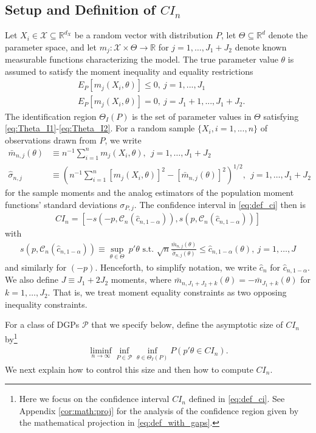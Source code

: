 \documentclass[letterpaper,11pt]{article}
\theoremstyle{myplain}
\theoremstyle{mydefinition}
\theoremstyle{myremark}
\newcommand{\R}{\mathbb{R}}
\newcommand{\cX}{\mathcal{X}}
\numberwithin{equation}{section}
\numberwithin{figure}{section}
\begin{document}
\subsection{Setup and Definition of $CI_n$}
Let $X_i\in\mathcal X\subseteq\mathbb R^{d_X}$ be a random vector with distribution $P$, let $\Theta\subseteq\mathbb R^{d}$ denote the parameter space, and let $m_j:\cX\times\Theta\to\R$ for $j=1,\dots,J_1+J_2$ denote known measurable functions characterizing the model. The true parameter value $\theta$ is assumed to satisfy the moment inequality and equality restrictions
\begin{align}
&E_{P}[m_j(X_i,\theta)]\le 0,~ j=1,..., J_1 \label{eq:Theta_I1}\\
&E_{P}[m_j(X_i,\theta)]= 0,~j=J_1+1,..., J_1+J_2.\label{eq:Theta_I2}
\end{align}
The identification region $\Theta_I(P)$ is the set of parameter values in $\Theta$ satisfying \eqref{eq:Theta_I1}-\eqref{eq:Theta_I2}. For a random sample $\{X_i,i=1,..., n\}$ of observations drawn from $P$, we write
\begin{align}
\bar m_{n,j}(\theta) &\equiv \textstyle{n^{-1}\sum_{i=1}^n m_j(X_i,\theta)},~~j=1,\dots, J_1+J_2 \label{eq:m_bar}\\
\hat{\sigma}_{n,j} &\equiv \textstyle{(n^{-1}\sum_{i=1}^n [m_j(X_i,\theta)]^2-[\bar m_{n,j}(\theta)]^2)^{1/2}},~~j=1,\dots, J_1+J_2\label{eq:sigma_hat}
\end{align}
for the sample moments and the analog estimators of the population moment functions' standard deviations $\sigma_{P,j}$. 
The confidence interval in \eqref{eq:def_ci} then is
\begin{align}
\label{eq:def_ci_KMS}
CI_n= [-s(-p,\mathcal C_n(\hat{c}_{n,1-\alpha})),s(p,\mathcal C_n(\hat{c}_{n,1-\alpha}))]
\end{align}
with
\begin{align}
\label{eq:CI}
s(p,\mathcal C_n(\hat{c}_{n,1-\alpha}))\equiv\sup_{\theta\in\Theta} ~p'\theta \text{   s.t. } \sqrt{n} \frac{\bar{m}_{n,j}(\theta )}{\hat{\sigma}_{n,j}(\theta )}\leq \hat{c}_{n,1-\alpha}(\theta),~j=1,\dots ,J
\end{align}
and similarly for $(-p)$. Henceforth, to simplify notation, we write $\hat{c}_n$ for $\hat{c}_{n,1-\alpha}$. We also define $J\equiv J_1+2J_2$ moments, where $\bar m_{n,J_1+J_2+k}(\theta)=-\bar m_{J_1+k}(\theta)$ for $k=1,\dots,J_2$. That is, we treat moment equality constraints as two opposing inequality constraints.

For a class of DGPs $\mathcal P$ that we specify below, define the asymptotic size of $CI_n$ by\footnote{Here we focus on the confidence interval $CI_n$ defined in \eqref{eq:def_ci}. See Appendix \ref{cor:math:proj} for the analysis of the confidence region given by the mathematical projection in \eqref{eq:def_with_gaps}.}
\begin{align}
	\liminf_{n\to\infty}\inf_{P\in\mathcal P}\inf_{\theta\in\Theta_I(P)}P(p'\theta\in CI_n). \label{eq:asy_size}
\end{align}
We next explain how to control this size and then how to compute $CI_n$.
\end{document}
